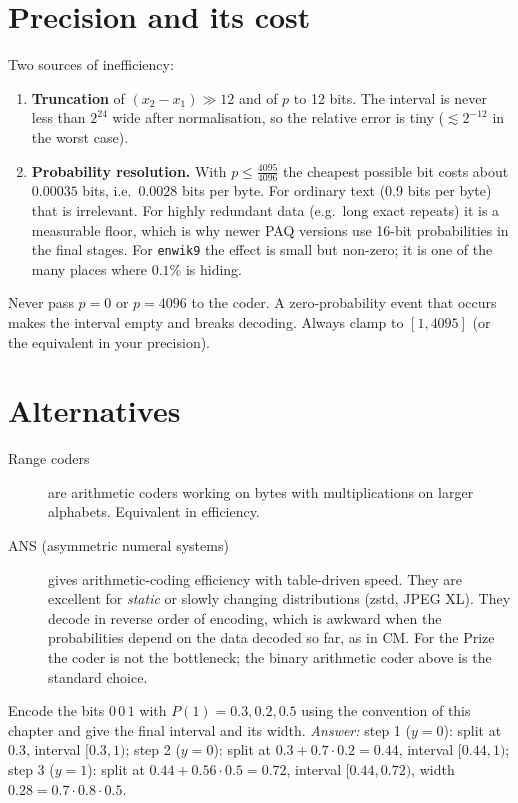 \documentclass[11pt,a4paper,openany]{book}
\newcommand{\code}[1]{\texttt{#1}}
\theoremstyle{definition}
\theoremstyle{remark}
\begin{document}
\section{Precision and its cost}

Two sources of inefficiency:
\begin{enumerate}
\item \textbf{Truncation} of $(x_2-x_1)\gg12$ and of $p$ to 12 bits. The interval is never less than $2^{24}$ wide after normalisation, so the relative error is tiny ($\lesssim2^{-12}$ in the worst case).
\item \textbf{Probability resolution.} With $p\le\frac{4095}{4096}$ the cheapest possible bit costs about $0.00035$ bits, i.e.\ $0.0028$ bits per byte. For ordinary text (0.9 bits per byte) that is irrelevant. For highly redundant data (e.g.\ long exact repeats) it is a measurable floor, which is why newer PAQ versions use 16-bit probabilities in the final stages. For \code{enwik9} the effect is small but non-zero; it is one of the many places where $0.1\%$ is hiding.
\end{enumerate}

\begin{pitfall}
Never pass $p=0$ or $p=4096$ to the coder. A zero-probability event that occurs makes the interval empty and breaks decoding. Always clamp to $[1,4095]$ (or the equivalent in your precision).
\end{pitfall}

\section{Alternatives}

\begin{description}
\item[Range coders] are arithmetic coders working on bytes with multiplications on larger alphabets. Equivalent in efficiency.
\item[ANS (asymmetric numeral systems)] gives arithmetic-coding efficiency with table-driven speed. They are excellent for \emph{static} or slowly changing distributions (zstd, JPEG XL). They decode in reverse order of encoding, which is awkward when the probabilities depend on the data decoded so far, as in CM. For the Prize the coder is not the bottleneck; the binary arithmetic coder above is the standard choice.
\end{description}

\begin{exercise}
Encode the bits $0\,0\,1$ with $P(1)=0.3,0.2,0.5$ using the convention of this chapter and give the final interval and its width. \emph{Answer:} step 1 ($y=0$): split at $0.3$, interval $[0.3,1)$; step 2 ($y=0$): split at $0.3+0.7\cdot0.2=0.44$, interval $[0.44,1)$; step 3 ($y=1$): split at $0.44+0.56\cdot0.5=0.72$, interval $[0.44,0.72)$, width $0.28=0.7\cdot0.8\cdot0.5$.
\end{exercise}
\end{document}
